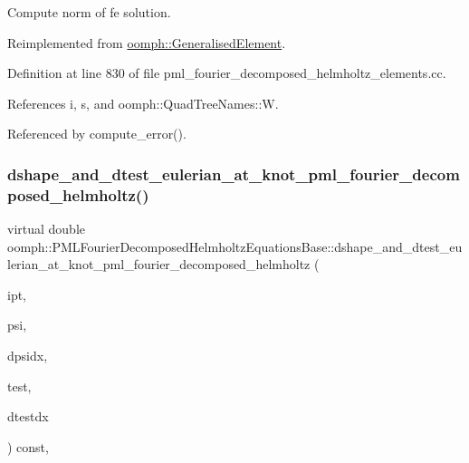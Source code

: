 Compute norm of fe solution. 



Reimplemented from \hyperlink{classoomph_1_1GeneralisedElement_af2025a472df6752a946739da58e7fb37}{oomph\+::\+Generalised\+Element}.



Definition at line 830 of file pml\+\_\+fourier\+\_\+decomposed\+\_\+helmholtz\+\_\+elements.\+cc.



References i, s, and oomph\+::\+Quad\+Tree\+Names\+::W.



Referenced by compute\+\_\+error().

\mbox{\label{classoomph_1_1PMLFourierDecomposedHelmholtzEquationsBase_a517cd98df2fee78db1cbdfe8fc8666e9}} 
\subsubsection{\texorpdfstring{dshape\+\_\+and\+\_\+dtest\+\_\+eulerian\+\_\+at\+\_\+knot\+\_\+pml\+\_\+fourier\+\_\+decomposed\+\_\+helmholtz()}{dshape\_and\_dtest\_eulerian\_at\_knot\_pml\_fourier\_decomposed\_helmholtz()}}
{\footnotesize\ttfamily virtual double oomph\+::\+P\+M\+L\+Fourier\+Decomposed\+Helmholtz\+Equations\+Base\+::dshape\+\_\+and\+\_\+dtest\+\_\+eulerian\+\_\+at\+\_\+knot\+\_\+pml\+\_\+fourier\+\_\+decomposed\+\_\+helmholtz (\begin{DoxyParamCaption}\item[{const unsigned \&}]{ipt,  }\item[{\hyperlink{classoomph_1_1Shape}{Shape} \&}]{psi,  }\item[{\hyperlink{classoomph_1_1DShape}{D\+Shape} \&}]{dpsidx,  }\item[{\hyperlink{classoomph_1_1Shape}{Shape} \&}]{test,  }\item[{\hyperlink{classoomph_1_1DShape}{D\+Shape} \&}]{dtestdx }\end{DoxyParamCaption}) const\hspace{0.3cm}{\ttfamily [protected]}, {}}



